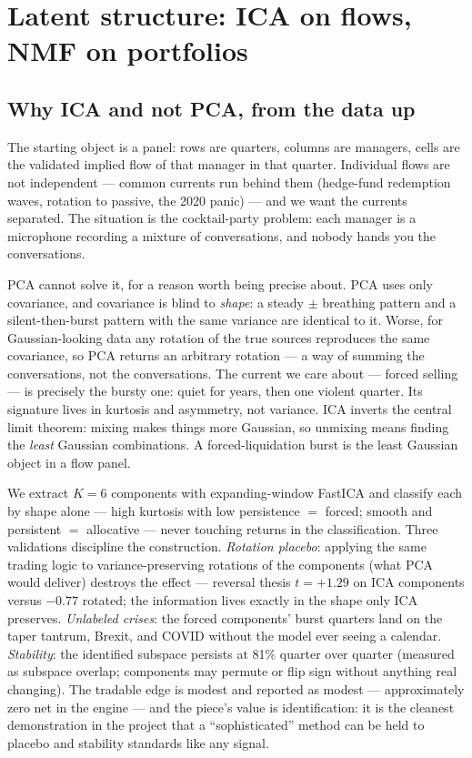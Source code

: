 \section{Latent structure: ICA on flows, NMF on portfolios}
\label{sec:latent}

\subsection{Why ICA and not PCA, from the data up}

The starting object is a panel: rows are quarters, columns are
managers, cells are the validated implied flow of that manager in
that quarter. Individual flows are not independent --- common
currents run behind them (hedge-fund redemption waves, rotation to
passive, the 2020 panic) --- and we want the currents separated. The
situation is the cocktail-party problem: each manager is a microphone
recording a mixture of conversations, and nobody hands you the
conversations.

PCA cannot solve it, for a reason worth being precise about. PCA uses
only covariance, and covariance is blind to \emph{shape}: a steady
$\pm$ breathing pattern and a silent-then-burst pattern with the same
variance are identical to it. Worse, for Gaussian-looking data any
rotation of the true sources reproduces the same covariance, so PCA
returns an arbitrary rotation --- a way of summing the
conversations, not the conversations. The current we care about ---
forced selling --- is precisely the bursty one: quiet for years, then
one violent quarter. Its signature lives in kurtosis and asymmetry,
not variance. ICA inverts the central limit theorem: mixing makes
things more Gaussian, so unmixing means finding the \emph{least}
Gaussian combinations. A forced-liquidation burst is the least
Gaussian object in a flow panel.

We extract $K=6$ components with expanding-window FastICA and
classify each by shape alone --- high kurtosis with low persistence
$=$ forced; smooth and persistent $=$ allocative --- never touching
returns in the classification. Three validations discipline the
construction. \emph{Rotation placebo}: applying the same trading
logic to variance-preserving rotations of the components (what PCA
would deliver) destroys the effect --- reversal thesis $t=+1.29$ on
ICA components versus $-0.77$ rotated; the information lives exactly
in the shape only ICA preserves. \emph{Unlabeled crises}: the forced
components' burst quarters land on the taper tantrum, Brexit, and
COVID without the model ever seeing a calendar. \emph{Stability}:
the identified subspace persists at 81\% quarter over quarter
(measured as subspace overlap; components may permute or flip sign
without anything real changing). The tradable edge is modest and
reported as modest --- approximately zero net in the engine --- and
the piece's value is identification: it is the cleanest demonstration
in the project that a ``sophisticated'' method can be held to placebo
and stability standards like any signal.

